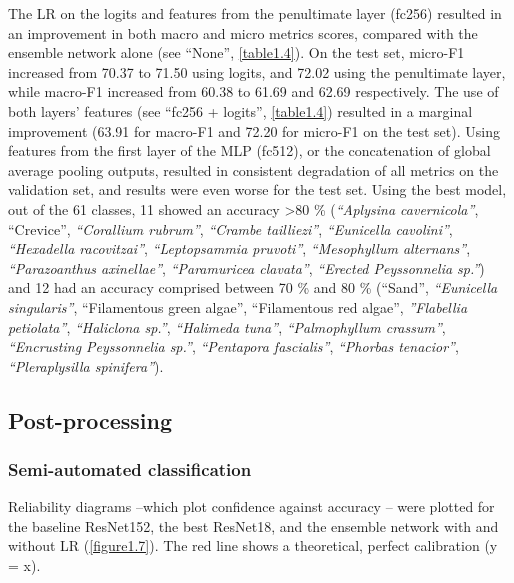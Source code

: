 The LR on the logits and features from the penultimate layer (fc256) resulted in an improvement in both macro and micro metrics scores, compared with the ensemble network alone (see “None”, \autoref{table1.4}). On the test set, micro-F1 increased from 70.37 to 71.50 using logits, and 72.02 using the penultimate layer, while macro-F1 increased from 60.38 to 61.69 and 62.69 respectively. The use of both layers’ features (see “fc256 + logits”, \autoref{table1.4}) resulted in a marginal improvement (63.91 for macro-F1 and 72.20 for micro-F1 on the test set). Using features from the first layer of the MLP (fc512), or the concatenation of global average pooling outputs, resulted in consistent degradation of all metrics on the validation set, and results were even worse for the test set. Using the best model, out of the 61 classes, 11 showed an accuracy >80 \% (\textit{“Aplysina cavernicola”}, “Crevice”, \textit{“Corallium rubrum”}, \textit{“Crambe tailliezi”}, \textit{“Eunicella cavolini”}, \textit{“Hexadella racovitzai”}, \textit{“Leptopsammia pruvoti”}, \textit{“Mesophyllum alternans”}, \textit{“Parazoanthus axinellae”}, \textit{“Paramuricea clavata”}, \textit{“Erected Peyssonnelia sp.”}) and 12 had an accuracy comprised between 70 \% and 80 \% (“Sand”, \textit{“Eunicella singularis”}, “Filamentous green algae”, “Filamentous red algae”, \textit{”Flabellia petiolata”}, \textit{“Haliclona sp.”}, \textit{“Halimeda tuna”}, \textit{“Palmophyllum crassum”}, \textit{“Encrusting Peyssonnelia sp.”}, \textit{“Pentapora fascialis”}, \textit{“Phorbas tenacior”}, \textit{“Pleraplysilla spinifera”}).

\subsection{Post-processing}\label{chapitre1_6.3}

\subsubsection{Semi-automated classification}\label{chapitre1_6.3.1}
Reliability diagrams –which plot confidence against accuracy – were plotted for the baseline ResNet152, the best ResNet18, and the ensemble network with and without LR (\autoref{figure1.7}). The red line shows a theoretical, perfect calibration (y = x).

